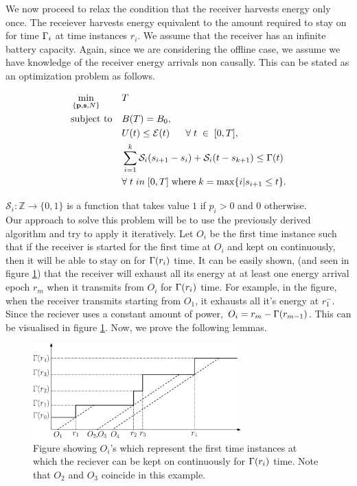 
We now proceed to relax the condition that the receiver harvests energy only once. The receiever harvests energy equivalent to the amount required to stay on for time $\Gamma_i$ at time instances $r_i$. 
We assume that the receiver has an infinite battery capacity. 
Again, since we are considering the offline case, we assume we have knowledge of the receiver energy arrivals non causally. This can be stated as an optimization problem as follows.\\
\begin{problem}
\begin{align}
&\min_{\{\textbf{p},\textbf{s},N\}}			&& T
\\
&\text{subject to} 				&& B(T)=B_0, 
\label{pb2_constraint_bits}
\\
&     										&& U(t)\le \mathcal{E}(t)  		\;\;\;\;\;\; \forall \; t\;\in\;[0,T], \label{pb2_constraint_energy}
\\
&    										&& \displaystyle \sum_{i=1}^k \mathcal{S}_i(s_{i+1} - s_i) + \mathcal{S}_i(t - s_{k+1}) \leq \TRx(t) \\ &&&\forall \; t \; in \; [0,T] \; \text{where} \; k = \max\{i| s_{i+1} \leq t\}.
\label{pb2_constraint_time}
\end{align}
\end{problem}
$\mathcal{S}_i:\mathbb{Z}\rightarrow\{0,1\}$ is a function that takes value $1$ if $p_i>0$ and $0$ otherwise.\\
Our approach to solve this problem will be to use the previously derived algorithm and try to apply it iteratively. Let $O_i$ be the first time instance such that if the receiver is started for the first time at $O_i$ and kept on continuously, then it will be able to stay on for $\Gamma(r_i)$ time. It can be easily shown, (and seen in figure \ref{figure_origin_points}) that the receiver will exhaust all its energy at at least one energy arrival epoch $r_m$ when it transmits from $O_i$ for $\Gamma(r_i)$ time. For example, in the figure, when the receiver transmits starting from $O_1$, it exhausts all it's energy at $r_1^-$. Since the reciever uses a constant amount of power, $O_i = r_m - \Gamma(r_{m-1})$. This can be visualised in figure \ref{figure_origin_points}. Now, we prove the following lemmas.\\

\begin{figure}
\centering
  \centerline{\includegraphics[width=8cm]{origin_points.eps}}
\caption{Figure showing $O_i$'s which represent the first time instances at which the reciever can be kept on continuously for $\Gamma(r_i)$ time. Note that $O_2$ and $O_3$ coincide in this example.}\label{figure_origin_points}
\end{figure}

